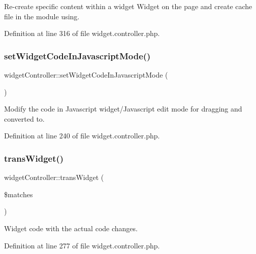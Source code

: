 Re-\/create specific content within a widget Widget on the page and create cache file in the module using. 



Definition at line 316 of file widget.\+controller.\+php.

\mbox{\label{classwidgetController_a528aa6c73d47f9149cfe88528d28b5c7}} 
\subsubsection{\texorpdfstring{set\+Widget\+Code\+In\+Javascript\+Mode()}{setWidgetCodeInJavascriptMode()}}
{\footnotesize\ttfamily widget\+Controller\+::set\+Widget\+Code\+In\+Javascript\+Mode (\begin{DoxyParamCaption}{ }\end{DoxyParamCaption})}



Modify the code in Javascript widget/\+Javascript edit mode for dragging and converted to. 



Definition at line 240 of file widget.\+controller.\+php.

\mbox{\label{classwidgetController_ab83211452280836e73df5f7b6acdea82}} 
\subsubsection{\texorpdfstring{trans\+Widget()}{transWidget()}}
{\footnotesize\ttfamily widget\+Controller\+::trans\+Widget (\begin{DoxyParamCaption}\item[{}]{\$matches }\end{DoxyParamCaption})}



Widget code with the actual code changes. 



Definition at line 277 of file widget.\+controller.\+php.

